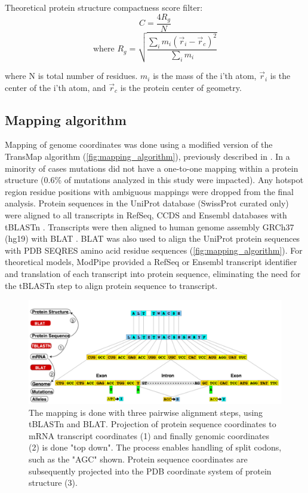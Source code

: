 Theoretical protein structure compactness score filter:
\begin{equation}
\label{eq:compactness}
C = \frac{4R_g}{N}
\end{equation}
\begin{equation}
\text{where } R_g=\sqrt{\frac{\sum_i{m_i(\vec{r}_i-\vec{r}_c)^2}}{\sum_i{m_i}}} 
\end{equation}

where N is total number of residues. $m_i$ is the mass of the i'th atom, $\vec{r}_i$ is the center of the i'th atom, and $\vec{r}_c$ is the protein center of geometry.

\subsection{Mapping algorithm}

Mapping of genome coordinates was done using a modified version of the TransMap algorithm (\autoref{fig:mapping_algorithm}), previously described in \cite{RN120}. In a minority of cases mutations did not have a one-to-one mapping within a protein structure (0.6\% of mutations analyzed in this study were impacted). Any hotspot region residue positions with ambiguous mappings were dropped from the final analysis. Protein sequences in the UniProt database (SwissProt curated only) \cite{RN121} were aligned to all transcripts in RefSeq, CCDS and Ensembl databases with tBLASTn \cite{RN122}.  Transcripts were then aligned to human genome assembly GRCh37 (hg19) with BLAT \cite{RN123}.  BLAT was also used to align the UniProt protein sequences with PDB SEQRES amino acid residue sequences (\autoref{fig:mapping_algorithm}).  For theoretical models, ModPipe provided a RefSeq or Ensembl transcript identifier and translation of each transcript into protein sequence, eliminating the need for the tBLASTn step to align protein sequence to transcript. 

\begin{figure}
  \centering
  \makeatletter
  \let\@currsize\normalsize
  \includegraphics[width=0.9\linewidth]{figures/chapter5/mapping_algorithm.png}
  \caption[Mapping of genomic coordinates onto protein structures and models with a modified version of the TransMap algorithm.]{The mapping is done with three pairwise alignment steps, using tBLASTn and BLAT.  Projection of protein sequence coordinates to mRNA transcript coordinates (1) and finally genomic coordinates (2) is done "top down". The process enables handling of split codons, such as the "AGC" shown.  Protein sequence coordinates are subsequently projected into the PDB coordinate system of protein structure (3).}
  \label{fig:mapping_algorithm}
\end{figure}

